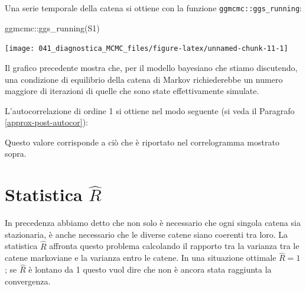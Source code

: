 \documentclass[
  11pt,
  italian,
  a4paper,
  extrafontsizes,onecolumn,openright
  ]{memoir}
\newenvironment{Shaded}{\begin{snugshade}}{\end{snugshade}}
\newcommand{\CommentTok}[1]{\textcolor[rgb]{0.56,0.35,0.01}{\textit{#1}}}
\newcommand{\DecValTok}[1]{\textcolor[rgb]{0.00,0.00,0.81}{#1}}
\newcommand{\FunctionTok}[1]{\textcolor[rgb]{0.00,0.00,0.00}{#1}}
\newcommand{\NormalTok}[1]{#1}
\newcommand{\SpecialCharTok}[1]{\textcolor[rgb]{0.00,0.00,0.00}{#1}}
\begin{document}
\noindent
Una serie temporale della catena si ottiene con la funzione \texttt{ggmcmc::ggs\_running}:

\begin{Shaded}
\begin{Highlighting}[]
\NormalTok{ggmcmc}\SpecialCharTok{::}\FunctionTok{ggs\_running}\NormalTok{(S1)}
\end{Highlighting}
\end{Shaded}

\begin{center}\texttt{[image: 041\_diagnostica\_MCMC\_files/figure-latex/unnamed-chunk-11-1]} \end{center}

\noindent
Il grafico precedente mostra che, per il modello bayesiano che stiamo discutendo, una condizione di equilibrio della catena di Markov richiederebbe un numero maggiore di iterazioni di quelle che sono state effettivamente simulate.

L'autocorrelazione di ordine 1 si ottiene nel modo seguente (si veda il Paragrafo \ref{approx-post-autocor}):

\begin{Shaded}
\end{Shaded}

\noindent
Questo valore corrisponde a ciò che è riportato nel correlogramma mostrato sopra.

\hypertarget{statistica-hatr}{%
\section{\texorpdfstring{Statistica \(\hat{R}\)}{Statistica \textbackslash hat\{R\}}}\label{statistica-hatr}}

In precedenza abbiamo detto che non solo è necessario che ogni singola catena sia stazionaria, è anche necessario che le diverse catene siano coerenti tra loro. La statistica \(\hat{R}\) affronta questo problema calcolando il rapporto tra la varianza tra le catene markoviane e la varianza entro le catene. In una situazione ottimale \(\hat{R} = 1\); se \(\hat{R}\) è lontano da 1 questo vuol dire che non è ancora stata raggiunta la convergenza.
\end{document}
